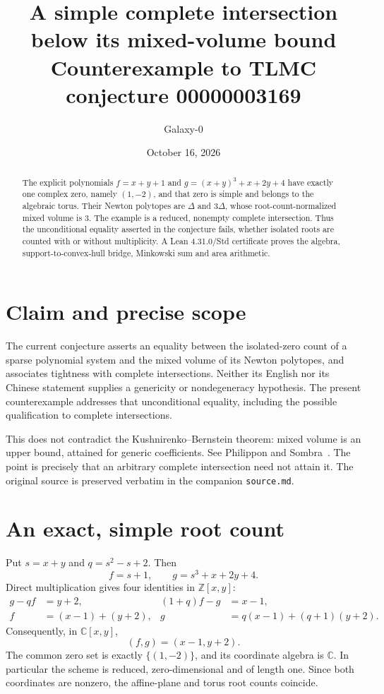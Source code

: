 \documentclass[11pt]{article}
\title{A simple complete intersection below its mixed-volume bound\\\large Counterexample to TLMC conjecture 00000003169}
\author{Galaxy-0}
\date{October 16, 2026}
\begin{document}
\maketitle
\begin{abstract}
The explicit polynomials $f=x+y+1$ and $g=(x+y)^3+x+2y+4$ have exactly one complex zero, namely $(1,-2)$, and that zero is simple and belongs to the algebraic torus. Their Newton polytopes are $\Delta$ and $3\Delta$, whose root-count-normalized mixed volume is $3$. The example is a reduced, nonempty complete intersection. Thus the unconditional equality asserted in the conjecture fails, whether isolated roots are counted with or without multiplicity. A Lean 4.31.0/Std certificate proves the algebra, support-to-convex-hull bridge, Minkowski sum and area arithmetic.
\end{abstract}
\section{Claim and precise scope}
The current conjecture asserts an equality between the isolated-zero count of a sparse polynomial system and the mixed volume of its Newton polytopes, and associates tightness with complete intersections. Neither its English nor its Chinese statement supplies a genericity or nondegeneracy hypothesis. The present counterexample addresses that unconditional equality, including the possible qualification to complete intersections.

This does not contradict the Kushnirenko--Bernstein theorem: mixed volume is an upper bound, attained for generic coefficients. See Philippon and Sombra~\cite{ps}. The point is precisely that an arbitrary complete intersection need not attain it. The original source is preserved verbatim in the companion \texttt{source.md}.
\section{An exact, simple root count}
Put $s=x+y$ and $q=s^2-s+2$. Then
\[
 f=s+1,\qquad g=s^3+x+2y+4.
\]
Direct multiplication gives four identities in $\mathbb Z[x,y]$:
\begin{align*}
 g-qf&=y+2, & (1+q)f-g&=x-1,\\
 f&=(x-1)+(y+2), &g&=q(x-1)+(q+1)(y+2).
\end{align*}
Consequently, in $\mathbb C[x,y]$,
\[
 (f,g)=(x-1,y+2).
\]
The common zero set is exactly $\{(1,-2)\}$, and its coordinate algebra is $\mathbb C$. In particular the scheme is reduced, zero-dimensional and of length one. Since both coordinates are nonzero, the affine-plane and torus root counts coincide.
\end{document}
